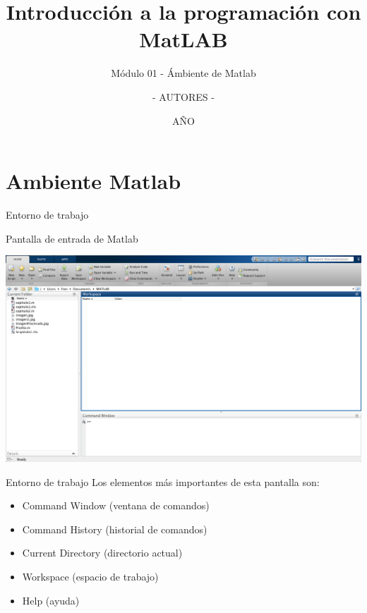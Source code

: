 \documentclass{bredelebeamer}
\title[Programación en MatLAB]{Introducción a la programación con MatLAB}
\subtitle{Módulo 01 - Ámbiente de Matlab}
\author{- AUTORES - \inst{1}}
\institute[UNIVERSIDAD]
{
  \inst{1}%
  - NOMBRE UNIVERSIDAD - 
  }
\date{AÑO}
\begin{document}
\begin{frame}
  \titlepage 
\end{frame}




\section{Ambiente Matlab}

\begin{frame}{Entorno de trabajo}
\begin{center}
Pantalla de entrada de Matlab
\end{center}
\begin{center}
\includegraphics[scale=0.17]{images/pantalla1.png}
\end{center}
\end{frame}

\begin{frame}{Entorno de trabajo}
Los elementos más importantes de esta pantalla son:\\
\begin{itemize}
\item Command Window (ventana de comandos)
\item Command History (historial de comandos)
\item Current Directory (directorio actual)
\item Workspace (espacio de trabajo)
\item Help (ayuda)
\end{itemize}
\end{frame}
\end{document}
